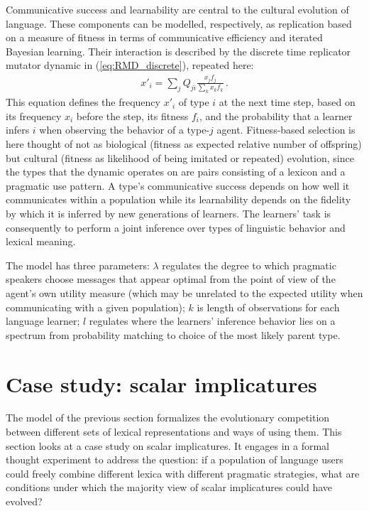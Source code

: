 \documentclass[a4paper, 11pt]{article}
\theoremstyle{Satz}
\begin{document}
Communicative success and learnability are central to the cultural evolution of language. These
components can be modelled, respectively, as replication based on a measure of fitness in terms
of communicative efficiency and iterated Bayesian learning. Their interaction is described by
the discrete time replicator mutator dynamic in (\ref{eq:RMD_discrete}), repeated here:
\begin{align*}
  x'_i = \sum_j Q_{ji} \frac{x_jf_j}{\sum_k x_k f_k}\,.
\end{align*}
This equation defines the frequency $x'_i$ of type $i$ at the next time step, based on its
frequency $x_i$ before the step, its fitness $f_i$, and the probability that a learner infers
$i$ when observing the behavior of a type-$j$ agent. Fitness-based selection is here thought of
not as biological (fitness as expected relative number of offspring) but cultural (fitness as
likelihood of being imitated or repeated) evolution, since the types that the dynamic operates
on are pairs consisting of a lexicon and a pragmatic use pattern. A type's communicative success depends
on how well it communicates within a population while its learnability depends on the
fidelity by which it is inferred by new generations of learners. The learners' task is
consequently to perform a joint inference over types of linguistic behavior and lexical
meaning.

The model has three parameters: $\lambda$ regulates the degree to which pragmatic speakers
choose messages that appear optimal from the point of view of the agent's own utility measure
(which may be unrelated to the expected utility when communicating with a given population);
$k$ is length of observations for each language learner; $l$ regulates where the learners'
inference behavior lies on a spectrum from probability matching to choice of the most likely
parent type.


\section{Case study: scalar implicatures}
\label{sec:si-case-study}

The model of the previous section formalizes the evolutionary competition between different
sets of lexical representations and ways of using them. This section looks at a case study on
scalar implicatures. It engages in a formal thought experiment to address the
question: if a population of language users could freely combine different lexica with
different pragmatic strategies, what are conditions under which the majority view of scalar
implicatures could have evolved?
\end{document}
